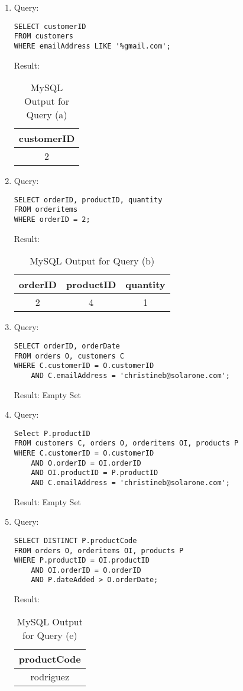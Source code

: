 \lstset{language=SQL}
\begin{enumerate}[label=(\alph*)]
\item Query:
\begin{lstlisting}
SELECT customerID
FROM customers
WHERE emailAddress LIKE '%gmail.com';
\end{lstlisting}
Result:
\begin{table}[H]\centering
\begin{tabular}{|c|}
\hline customerID\\
\hline 2\\
\hline
\end{tabular}
\caption{MySQL Output for Query (a)}\label{tab31}
\end{table}

\item Query:
\begin{lstlisting}
SELECT orderID, productID, quantity
FROM orderitems
WHERE orderID = 2;
\end{lstlisting}
Result:
\begin{table}[H]\centering
\begin{tabular}{|c|c|c|}
\hline
orderID & productID & quantity\\
\hline
2 & 4 & 1\\
\hline
\end{tabular}
\caption{MySQL Output for Query (b)}\label{tab32}
\end{table}

\item Query:
\begin{lstlisting}
SELECT orderID, orderDate
FROM orders O, customers C
WHERE C.customerID = O.customerID
	AND C.emailAddress = 'christineb@solarone.com';
\end{lstlisting}
Result: Empty Set

\item Query:
\begin{lstlisting}
Select P.productID
FROM customers C, orders O, orderitems OI, products P
WHERE C.customerID = O.customerID
	AND O.orderID = OI.orderID
	AND OI.productID = P.productID
	AND C.emailAddress = 'christineb@solarone.com';
\end{lstlisting}
Result: Empty Set

\item Query:
\begin{lstlisting}
SELECT DISTINCT P.productCode
FROM orders O, orderitems OI, products P
WHERE P.productID = OI.productID
	AND OI.orderID = O.orderID
	AND P.dateAdded > O.orderDate;
\end{lstlisting}
Result:
\begin{table}[H]\centering
\begin{tabular}{|c|}
\hline
productCode\\
\hline
rodriguez\\
\hline
\end{tabular}
\caption{MySQL Output for Query (e)}\label{tab33}
\end{table}


\end{enumerate}
